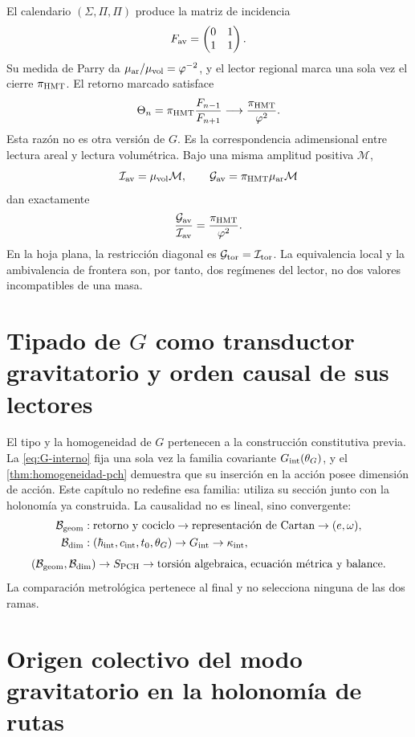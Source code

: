 El calendario \((\Sigma,\Pi,\Pi)\) produce la matriz de incidencia
\[
 F_{\rm av}=\begin{pmatrix}0&1\\1&1\end{pmatrix}.
\]
Su medida de Parry da
\(\mu_{\rm ar}/\mu_{\rm vol}=\varphi^{-2}\), y el lector regional marca una
sola vez el cierre \(\pi_{\rm HMT}\).  El retorno marcado satisface
\[
 \Theta_n
 =\pi_{\rm HMT}\frac{F_{n-1}}{F_{n+1}}
 \longrightarrow
 \frac{\pi_{\rm HMT}}{\varphi^2}.
\]
Esta razón no es otra versión de \(G\). Es la correspondencia adimensional entre
lectura areal y lectura volumétrica.  Bajo una misma amplitud positiva
\(\mathcal M\),
\[
 \mathcal I_{\rm av}=\mu_{\rm vol}\mathcal M,\qquad
 \mathcal G_{\rm av}=\pi_{\rm HMT}\mu_{\rm ar}\mathcal M
\]
dan exactamente
\[
 \frac{\mathcal G_{\rm av}}{\mathcal I_{\rm av}}
 =\frac{\pi_{\rm HMT}}{\varphi^2}.
\]
En la hoja plana, la restricción diagonal es
\(\mathcal G_{\rm tor}=\mathcal I_{\rm tor}\).  La equivalencia local y la
ambivalencia de frontera son, por tanto, dos regímenes del lector, no dos
valores incompatibles de una masa.

\section{Tipado de \(G\) como transductor gravitatorio y orden causal de sus lectores}

El tipo y la homogeneidad de \(G\) pertenecen a la construcción
constitutiva previa. La \cref{eq:G-interno} fija una sola vez la familia
covariante \(G_{\rm int}(\theta_G)\), y el
\cref{thm:homogeneidad-pch} demuestra que su inserción en la acción posee
dimensión de acción. Este capítulo no redefine esa familia: utiliza su
sección junto con la holonomía ya construida. La causalidad no es lineal,
sino convergente:
\[
\begin{aligned}
 \mathcal B_{\rm geom}&:
 \text{retorno y cociclo}\to\text{representación de Cartan}
 \to(e,\omega),\\
 \mathcal B_{\rm dim}&:
 (\hbar_{\rm int},c_{\rm int},t_0,\theta_G)
 \to G_{\rm int}\to\kappa_{\rm int},
\end{aligned}
\]
\[
 (\mathcal B_{\rm geom},\mathcal B_{\rm dim})
 \to S_{\rm PCH}
 \to\text{torsión algebraica, ecuación métrica y balance}.
\]
La comparación metrológica pertenece al final y no selecciona ninguna de
las dos ramas.

\section{Origen colectivo del modo gravitatorio en la holonomía de rutas}

